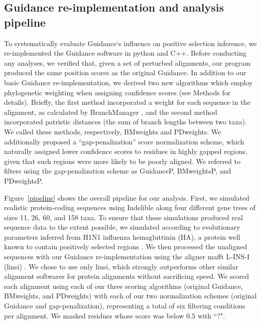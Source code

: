 \documentclass[12pt]{article}
\begin{document}
\subsection*{Guidance re-implementation and analysis pipeline}
To systematically evaluate Guidance`s influence on positive selection inference, we re-implemented the Guidance software in python and C++. Before conducting any analyses, we verified that, given a set of perturbed alignments, our program produced the same position scores as the original Guidance. In addition to our basic Guidance re-implementation, we derived two new algorithms which employ phylogenetic weighting when assigning confidence scores (see Methods for details).  Briefly, the first method incorporated a weight for each sequence in the alignment, as calculated by BranchManager \citep{Stone2007}, and the second method incorporated patristic distances (the sum of branch lengths between two taxa). We called these methods, respectively, BMweights and PDweights.  We additionally proposed a ``gap-penalization” score normalization scheme, which naturally assigned lower confidence scores to residues in highly gapped regions, given that such regions were more likely to be poorly aligned. We referred to filters using the gap-penalization scheme as GuidanceP, BMweightsP, and PDweightsP.

Figure~\ref{pipeline} shows the overall pipeline for our analysis. First, we simulated realistic protein-coding sequences using Indelible \citep{Fletcher2009} along four different gene trees of sizes 11, 26, 60, and 158 taxa. To ensure that these simulations produced real sequence data to the extent possible, we simulated according to evolutionary parameters inferred from H1N1 influenza hemagluttinin (HA), a protein well known to contain positively selected regions \citep{Meyer2012}. We then processed the unaligned sequences with our Guidance re-implementation using the aligner mafft L-INS-I (linsi) \citep{Katoh2005}. We chose to use only linsi, which strongly outperforms other similar alignment softwares for protein alignments \citep{Thompson2011,Nuin2006}without sacrificing speed. We scored each alignment using each of our three scoring algorithms (original Guidance, BMweights, and PDweights) with each of our two normalization schemes (original Guidance and gap-penalization), representing a total of six filtering conditions per alignment. We masked residues whose score was below $0.5$ with ``?".  
\end{document}
